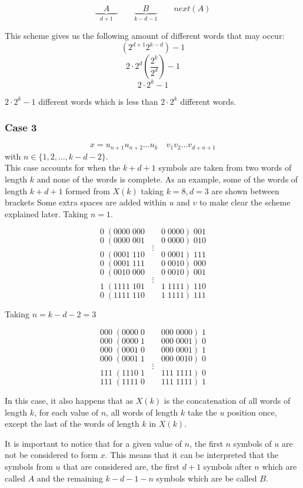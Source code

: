 \documentclass[11pt,a4paper]{tesis}
\theoremstyle{definition}
\begin{document}
$$\underbrace{\quad A \quad }_{d +1} \qquad \underbrace{\quad B \quad }_{k - d - 1}  \qquad next(A)$$

This scheme gives us the following amount of different words that may occur:
$$(2^{d + 1} 2^{k-d})-1$$
$$ 2\cdot 2^d  (\frac{2^k}{2^d}) - 1$$
$$ 2 \cdot 2^k - 1$$

$ 2 \cdot 2^k - 1 $ different words which is less than $2 \cdot 2^k$ different words.

\subsubsection{Case 3}
$$x = u_{n+1} u_{n+2} \dots u_k \quad  v_1 v_2 \dots v_{d+n+1} $$
with $n \in \{1,2,\dots ,k - d - 2\}$.
\\

This case accounts for when the $k + d + 1$ symbols are taken from two words of length $k$ and none of the words is complete.
As an example, some of the words of length $k + d + 1$ formed from $X(k)$ taking $k = 8, d = 3$ are shown between brackets
Some extra spaces are added within $u$ and $v$ to make clear the scheme explained later.
Taking $n = 1$.


$$0\; (0000\; 000 \qquad 0 \;0000 ) \;001$$
$$0\; (0000 \;001 \qquad 0 \;0000 ) \;010$$
$$\vdots$$
$$0\; (0001 \;110 \qquad 0 \;0001 ) \;111$$
$$0\; (0001 \;111 \qquad 0 \;0010 ) \;000$$
$$0\; (0010 \;000 \qquad 0 \;0010 ) \;001$$
$$\vdots$$
$$1\; (1111 \;101 \qquad 1 \;1111 ) \;110$$
$$0\; (1111 \;110 \qquad 1 \;1111 ) \;111$$

Taking $n = k - d - 2 = 3$

$$000\; (0000\; 0 \qquad 000 \;0000 ) \;1$$
$$000\; (0000\; 1 \qquad 000 \;0001 ) \;0$$
$$000\; (0001\; 0 \qquad 000 \;0001 ) \;1$$
$$000\; (0001\; 1 \qquad 000 \;0010 ) \;0$$
$$\vdots$$
$$111\; (1110\; 1 \qquad 111 \;1111 ) \;0$$
$$111\; (1111\; 0 \qquad 111 \;1111 ) \;1$$

In this case, it also happens that as $X(k)$ is the concatenation of all words of length $k$, for each value of $n$, all words of length $k$ take the $u$ position once, except the last of the words of length $k$ in $X(k)$.

It is important to notice that for a given value of $n$, the first $n$ symbols of $u$ are not be considered to form $x$. This means that it can be interpreted that the symbols from  $u$ that are considered are, the first $d + 1$ symbols after $n$ which are called $A$ and the remaining $k - d - 1 - n$ symbols which are be called $B$.
\end{document}
